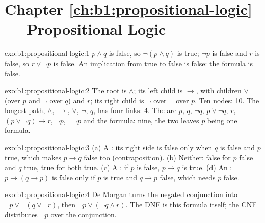 \section*{Chapter \ref{ch:b1:propositional-logic} --- Propositional Logic}

\begin{solution}{exo:b1:propositional-logic:1}
$p \wedge q$ is false, so $\neg(p \wedge q)$ is true; $\neg p$ is false and $r$ is false, so $r \vee \neg p$ is false. An
implication from true to false is false: the formula is false.
\end{solution}

\begin{solution}{exo:b1:propositional-logic:2}
The root is $\wedge$; its left child is $\rightarrow$, with children $\vee$ (over $p$ and $\neg$ over $q$) and $r$; its
right child is $\neg$ over $\neg$ over $p$. Ten nodes:  10. The longest path, $\wedge$, $\rightarrow$, $\vee$, $\neg$,
$q$, has four links:  4. The  are $p$, $q$, $\neg q$, $p \vee \neg q$, $r$, $(p \vee \neg q)
\rightarrow r$, $\neg p$, $\neg\neg p$ and the formula: nine, the two leaves $p$ being one formula.
\end{solution}

\begin{solution}{exo:b1:propositional-logic:3}
(a) A : its right side is false only when $q$ is false and $p$ true, which makes $p \rightarrow q$ false too
(contraposition). (b) Neither: false for $p$ false and $q$ true, true for both true. (c) A : if $p$ is false,
$p \rightarrow q$ is true. (d) An : $p \rightarrow (q \rightarrow p)$ is false only if $p$ is true and $q
\rightarrow p$ false, which needs $p$ false.
\end{solution}

\begin{solution}{exo:b1:propositional-logic:4}
De Morgan turns the negated conjunction into $\neg p \vee \neg(q \vee \neg r)$, then $\neg p \vee (\neg q \wedge r)$. The
DNF is this formula itself; the CNF distributes $\neg p$ over the conjunction.
\end{solution}

